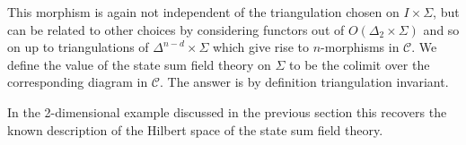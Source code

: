 This morphism is again not independent of the triangulation chosen on $I\times \Sigma $, but can be related to other choices by considering functors out of $O(\Delta_2 \times \Sigma)$ and so on up to triangulations of $\Delta^{n-d}\times \Sigma $ which give rise to $n$-morphisms in $\mathcal{C}$.
We define the value of the state sum field theory on $\Sigma$ to be the colimit over the corresponding diagram in $\mathcal{C}$.
The answer is by definition triangulation invariant.


In the 2-dimensional example discussed in the previous section this recovers the known description of the Hilbert space of the state sum field theory.
